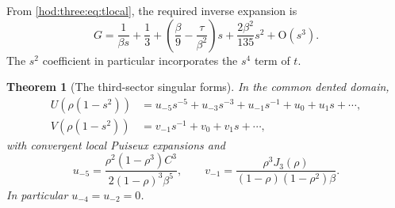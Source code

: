 \documentclass[11pt,letterpaper]{article}
\newtheorem{theorem}{Theorem}[section]
\theoremstyle{definition}\newtheorem{definition}[theorem]{Definition}
\theoremstyle{remark}\newtheorem{remark}[theorem]{Remark}
\newcommand{\OO}{\mathrm O}
\begin{document}
From \eqref{hod:three:eq:tlocal}, the required inverse expansion is
\begin{equation}\label{hod:three:eq:Glocal}
G=\frac1{\beta s}+\frac13+
\left(\frac\beta9-\frac\tau{\beta^2}\right)s+\frac{2\beta^2}{135}s^2+\OO(s^3).
\end{equation}
The $s^2$ coefficient in particular incorporates the $s^4$ term of $t$.

\begin{theorem}[The third-sector singular forms]\label{hod:three:thm:poles}
In the common dented domain,
\begin{align}
U(\rho(1-s^2))&=u_{-5}s^{-5}+u_{-3}s^{-3}+u_{-1}s^{-1}+u_0+u_1s+\cdots,\label{hod:three:eq:Useries}\\
V(\rho(1-s^2))&=v_{-1}s^{-1}+v_0+v_1s+\cdots,\label{hod:three:eq:Vseries}
\end{align}
with convergent local Puiseux expansions and
\begin{equation}\label{hod:three:eq:leadingpoles}
u_{-5}=\frac{\rho^2(1-\rho^3)C^3}{2(1-\rho)^3\beta^5},\qquad
v_{-1}=\frac{\rho^3J_3(\rho)}{(1-\rho)(1-\rho^2)\beta}.
\end{equation}
In particular $u_{-4}=u_{-2}=0$.
\end{theorem}
\end{document}
